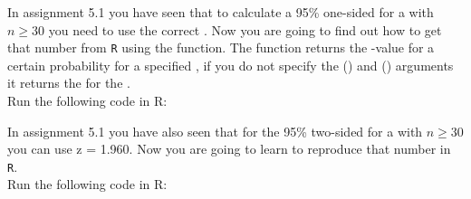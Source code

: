 \setcounter{section}{5}
\setcounter{subsection}{2}
\setcounter{question}{0}



In assignment 5.1 you have seen that to calculate a 95\% one-sided  for a  with $n \geq 30$ you need to use the correct . Now you are going to find out how to get that number from \texttt{R} using the  function. The  function returns the -value for a certain probability for a specified , if you do not specify the  () and  () arguments it returns the  for the . \\

Run the following code in R: \\




In assignment 5.1 you have also seen that for the 95\% two-sided  for a  with $n \geq 30$ you can use z = 1.960. Now you are going to learn to reproduce that number in \texttt{R}. \\

Run the following code in R: \\



\twolineanswerbox

\clearpage %

